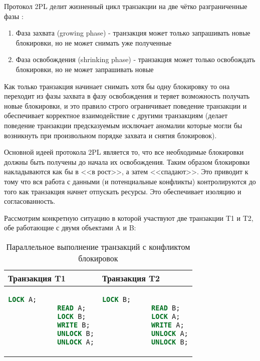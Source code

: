 Протокол 2PL делит жизненный цикл транзакции на две чётко разграниченные фазы \autocite[ch.18 §1.3]{Silberschatz}:

\begin{enumerate}
    \item Фаза захвата (growing phase) - транзакция может только запрашивать новые блокировки, но не может снимать уже полученные
    \item Фаза освобождения (shrinking phase) - транзакция может только освобождать блокировки, но не может запрашивать новые
\end{enumerate}

Как только транзакция начинает снимать хотя бы одну блокировку то она переходит из фазы захвата в фазу освобождения и теряет возможность получать новые блокировки, и это правило строго ограничивает поведение транзакции и обеспечивает корректное взаимодействие с другими транзакциям (делает поведение транзакции предсказуемым \textrightarrow исключает аномалии которые могли бы возникнуть при произвольном порядке захвата и снятия блокировок). \autocites[ch.18 §1.3]{Silberschatz}[ch.22 §1.2]{ElmasriNavathe}

Основной идеей протокола 2PL является то, что все необходимые блокировки должны быть получены до начала их освобождения. Таким образом блокировки накладываются как бы в <<в рост>>, а затем <<спадают>>. Это приводит к тому что вся работа с данными (и потенциальные конфликты) контролируются до того как транзакция начнет отпускать ресурсы. Это обеспечивает изоляцию и согласованность. \autocite[ch.18 §1.3]{Silberschatz}

Рассмотрим конкретную ситуацию в которой участвуют две транзакции T1 и T2, обе работающие с двумя объектами A и B:
\begin{table}[H]
    \centering
    \begin{tabular}{|p{7cm}|p{7cm}|}
        \hline
        \textbf{Транзакция T1} & \textbf{Транзакция T2} \\
        \hline
        \begin{lstlisting}[language=SQL]
            LOCK A;
            READ A;
            LOCK B;
            WRITE B;
            UNLOCK B;
            UNLOCK A;
        \end{lstlisting}
        &
        \begin{lstlisting}[language=SQL]
            LOCK B;
            READ B;
            LOCK A;
            WRITE A;
            UNLOCK A;
            UNLOCK B;
        \end{lstlisting} \\
        \hline
    \end{tabular}
    \caption{Параллельное выполнение транзакций с конфликтом блокировок}
    \label{tab:conflict_transactions}
\end{table}
    
